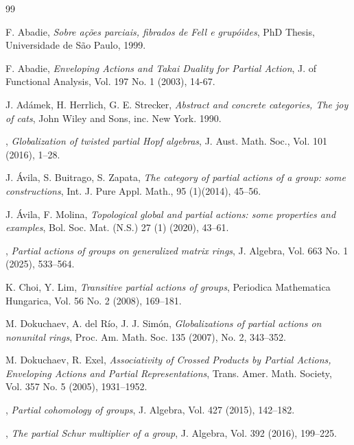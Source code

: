 \documentclass[sn-mathphys-num]{sn-jnl}%
\theoremstyle{thmstyleone}%
\theoremstyle{thmstyletwo}%
\theoremstyle{thmstylethree}%
\begin{document}
\begin{thebibliography}{99}


{\sc F. Abadie}, {\em Sobre a\c{c}\~{o}es parciais, fibrados de Fell e grupóides},
PhD Thesis, Universidade de S\~{a}o Paulo, 1999.


{\sc  F. Abadie}, {\em Enveloping Actions and Takai Duality for Partial Action},
J. of Functional Analysis, Vol. 197 No. 1 (2003), 14-67.

{\sc J. Adámek, H. Herrlich, G. E. Strecker}, {\em Abstract and concrete categories, The joy of cats},
John Wiley and Sons, inc. New York. 1990.

, {\em Globalization of twisted partial Hopf algebras}, J. Aust. Math. Soc., Vol. 101 (2016), 1--28.

{\sc J. Ávila, S. Buitrago, S. Zapata}, {\em The category of partial actions of a group: some constructions},
Int. J. Pure Appl. Math., 95 (1)(2014), 45--56.

{\sc J. Ávila, F. Molina}, {\em Topological global and partial actions: some properties and examples},
Bol. Soc. Mat. (N.S.) 27 (1) (2020), 43--61.

, {\em Partial actions of groups on generalized matrix rings}, J. Algebra, Vol. 663 No. 1 (2025), 533--564.

{\sc K. Choi,  Y. Lim}, {\em Transitive partial actions of groups},
Periodica Mathematica Hungarica, Vol. 56 No. 2 (2008), 169--181.

{\sc M. Dokuchaev, A. del Río, J. J. Simón}, {\em Globalizations of partial actions on nonunital rings},
Proc. Am. Math. Soc. 135 (2007), No. 2, 343--352.

{\sc M. Dokuchaev,  R. Exel}, {\em Associativity of Crossed Products by Partial Actions,
Enveloping Actions and Partial Representations},
Trans. Amer. Math. Society,
Vol. 357 No. 5 (2005), 1931--1952.

, {\em Partial cohomology of groups}, J. Algebra, Vol. 427 (2015), 142--182.


, {\em The partial Schur multiplier of a group}, J. Algebra, Vol. 392 (2016), 199--225.



\end{thebibliography}
\end{document}
